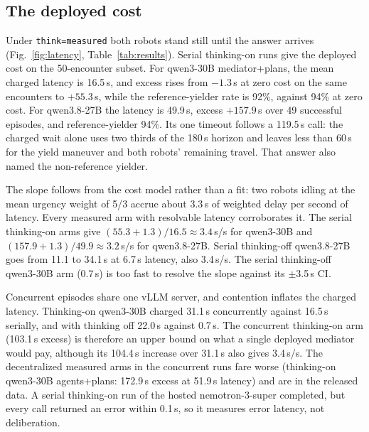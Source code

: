 \documentclass[journal]{IEEEtran}
\begin{document}
\subsection{The deployed cost}
\label{sec:latency}
Under \texttt{think=measured} both robots stand still until the answer arrives (Fig.~\ref{fig:latency}, Table~\ref{tab:results}). Serial thinking-on runs give the deployed cost on the 50-encounter subset. For qwen3-30B mediator+plans, the mean charged latency is 16.5\,s, and excess rises from $-1.3$\,s at zero cost on the same encounters to $+55.3$\,s, while the reference-yielder rate is 92\%, against 94\% at zero cost. For qwen3.8-27B the latency is 49.9\,s, excess $+157.9$\,s over 49 successful episodes, and reference-yielder 94\%. Its one timeout follows a 119.5\,s call: the charged wait alone uses two thirds of the 180\,s horizon and leaves less than 60\,s for the yield maneuver and both robots' remaining travel. That answer also named the non-reference yielder.

The slope follows from the cost model rather than a fit: two robots idling at the mean urgency weight of 5/3 accrue about 3.3\,s of weighted delay per second of latency. Every measured arm with resolvable latency corroborates it. The serial thinking-on arms give $(55.3+1.3)/16.5\approx3.4$\,s/s for qwen3-30B and $(157.9+1.3)/49.9\approx3.2$\,s/s for qwen3.8-27B. Serial thinking-off qwen3.8-27B goes from 11.1 to 34.1\,s at 6.7\,s latency, also 3.4\,s/s. The serial thinking-off qwen3-30B arm (0.7\,s) is too fast to resolve the slope against its $\pm$3.5\,s CI.

Concurrent episodes share one vLLM server, and contention inflates the charged latency. Thinking-on qwen3-30B charged 31.1\,s concurrently against 16.5\,s serially, and with thinking off 22.0\,s against 0.7\,s. The concurrent thinking-on arm (103.1\,s excess) is therefore an upper bound on what a single deployed mediator would pay, although its 104.4\,s increase over 31.1\,s also gives 3.4\,s/s. The decentralized measured arms in the concurrent runs fare worse (thinking-on qwen3-30B agents+plans: 172.9\,s excess at 51.9\,s latency) and are in the released data. A serial thinking-on run of the hosted nemotron-3-super completed, but every call returned an error within 0.1\,s, so it measures error latency, not deliberation.
\end{document}
